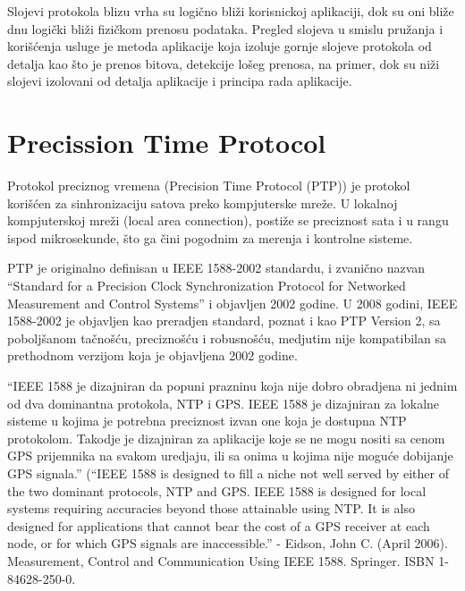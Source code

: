 \documentclass[a4paper,12pt, master]{etf}
\begin{document}
	Slojevi protokola blizu vrha su logi\v{c}no bli\v{z}i korisnickoj aplikaciji, dok su oni bli\v{z}e dnu
	logi\v{c}ki bli\v{z}i fizi\v{c}kom prenosu podataka. Pregled slojeva u smislu pru\v{z}anja i kori\v{s}\'{c}enja
	usluge je metoda aplikacije koja izoluje gornje slojeve protokola od detalja kao \v{s}to je
	prenos bitova, detekcije lo\v{s}eg prenosa, na primer, dok su ni\v{z}i slojevi izolovani od detalja
	aplikacije i principa rada aplikacije.

	\section{Precission Time Protocol}

	Protokol preciznog vremena (Precision Time Protocol (PTP)) je protokol
	kori\v{s}\'{c}en za sinhronizaciju satova preko kompjuterske mre\v{z}e. U lokalnoj
	kompjuterskoj mre\v{z}i (local area connection), posti\v{z}e se preciznost sata i u rangu
	ispod mikrosekunde, \v{s}to ga \v{c}ini pogodnim za merenja i kontrolne sisteme.

	PTP je originalno definisan u IEEE 1588-2002 standardu, i zvani\v{c}no nazvan
	``Standard for a Precision Clock Synchronization Protocol for Networked Measurement
	and Control Systems'' i objavljen 2002 godine. U 2008 godini, IEEE 1588-2002 je
        objavljen kao preradjen standard, poznat i kao PTP Version 2, sa pobolj\v{s}anom
        ta\v{c}no\v{s}\'{c}u, precizno\v{s}\'{c}u i robusno\v{s}\'{c}u, medjutim nije kompatibilan
        sa prethodnom verzijom koja je objavljena 2002 godine.

	``IEEE 1588 je dizajniran da popuni prazninu koja nije dobro obradjena ni jednim od dva
	dominantna protokola, NTP i GPS\@. IEEE 1588 je dizajniran za lokalne sisteme u kojima je
	potrebna preciznost izvan one koja je dostupna NTP protokolom. Takodje je dizajniran za
	aplikacije koje se ne mogu nositi sa cenom GPS prijemnika na svakom uredjaju, ili sa onima
        u kojima nije mogu\'{c}e dobijanje GPS signala.'' (``IEEE 1588 is designed to fill a niche
        not well served by either of the two dominant protocols, NTP and GPS\@. IEEE 1588 is designed
        for local systems requiring accuracies beyond those attainable using NTP\@. It is also designed
        for applications that cannot bear the cost of a GPS receiver at each node, or for which GPS
        signals are inaccessible.'' - Eidson, John C. (April 2006). Measurement, Control and
        Communication Using IEEE 1588. Springer. ISBN 1-84628-250-0.
\end{document}
